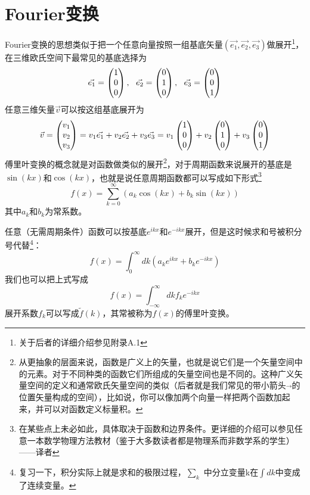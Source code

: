 \section{Fourier变换}\label{appendix.D.1}
Fourier变换的思想类似于把一个任意向量按照一组基底矢量$(\vec{e_1},\vec{e_2},\vec{e_3})$做展开\footnote{关于后者的详细介绍参见附录A.1}，在三维欧氏空间下最常见的基底选择为
\begin{equation}
\vec{e_1}=\begin{pmatrix} 1\\0\\0 \end{pmatrix},~~
\vec{e_2}=\begin{pmatrix} 0\\1\\0 \end{pmatrix},~~
\vec{e_3}=\begin{pmatrix} 0\\0\\1 \end{pmatrix}
\end{equation}
任意三维矢量$\vec{v}$可以按这组基底展开为
\begin{equation}
\vec{v}=\begin{pmatrix} v_1\\v_2\\v_3 \end{pmatrix} =v_1\vec{e_1}+v_2\vec{e_2}+v_3\vec{e_3}=v_1\begin{pmatrix} 1\\0\\0 \end{pmatrix}+v_2\begin{pmatrix} 0\\1\\0 \end{pmatrix} +v_3\begin{pmatrix} 0\\0\\1 \end{pmatrix}
\end{equation}
傅里叶变换的概念就是对函数做类似的展开\footnote{从更抽象的层面来说，函数是广义上的矢量，也就是说它们是一个矢量空间中的元素。对于不同种类的函数它们所组成的矢量空间也是不同的。这种广义矢量空间的定义和通常欧氏矢量空间的类似（后者就是我们常见的带小箭头$\vec{~}$的位置矢量构成的空间），比如说，你可以像加两个向量一样把两个函数加起来，并可以对函数定义标量积。}，对于周期函数来说展开的基底是$\sin(kx)$和$\cos(kx)$，也就是说任意周期函数都可以写成如下形式\footnote{在某些点上未必如此，具体取决于函数和边界条件。更详细的介绍可以参见任意一本数学物理方法教材（鉴于大多数读者都是物理系而非数学系的学生）——译者}
\begin{equation}
  f(x)=\sum^{\infty}_{k=0}(a_k\cos(kx)+b_k\sin(kx))
\end{equation}
其中$a_k$和$b_k$为常系数。\par
任意（无需周期条件）函数可以按基底$e^{ikx}$和$e^{-ikx}$展开，但是这时候求和号被积分号代替\footnote{复习一下，积分实际上就是求和的极限过程，$\sum_k$ 中分立变量k在$\int dk$中变成了连续变量。}：
\begin{equation}
  f(x)=\int^\infty_0 dk(a_k e^{ikx}+b_k e^{-ikx})
\end{equation}
我们也可以把上式写成
\begin{equation}
  f(x)=\int^\infty_{-\infty} dk f_k e^{-ikx}
\end{equation}
展开系数$f_k$可以写成$\tilde f(k)$，其常被称为$f(x)$的傅里叶变换。

